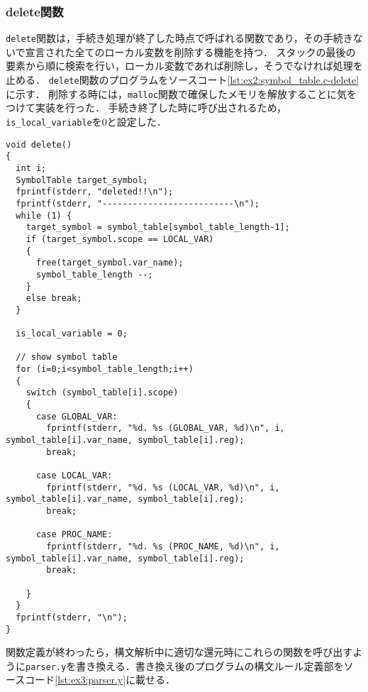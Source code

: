 \documentclass[uplatex]{jsarticle}
\begin{document}
\subsubsection{delete関数}
\verb#delete#関数は，手続き処理が終了した時点で呼ばれる関数であり，その手続きないで宣言された全てのローカル変数を削除する機能を持つ．
スタックの最後の要素から順に検索を行い，ローカル変数であれば削除し，そうでなければ処理を止める．
\verb#delete#関数のプログラムをソースコート\ref{lst:ex2:symbol_table.c-delete}に示す．
削除する時には，\verb#malloc#関数で確保したメモリを解放することに気をつけて実装を行った．
手続き終了した時に呼び出されるため，\verb#is_local_variable#を0と設定した．
\begin{lstlisting}[caption=delete関数,label=lst:ex2:symbol_table.c-delete]
void delete()
{
  int i;
  SymbolTable target_symbol;
  fprintf(stderr, "deleted!!\n");
  fprintf(stderr, "--------------------------\n");
  while (1) {
    target_symbol = symbol_table[symbol_table_length-1];
    if (target_symbol.scope == LOCAL_VAR)
    {
      free(target_symbol.var_name);
      symbol_table_length --;
    }
    else break;
  }

  is_local_variable = 0;

  // show symbol table
  for (i=0;i<symbol_table_length;i++)
  {
    switch (symbol_table[i].scope)
    {
      case GLOBAL_VAR:
        fprintf(stderr, "%d. %s (GLOBAL_VAR, %d)\n", i, symbol_table[i].var_name, symbol_table[i].reg);
        break;

      case LOCAL_VAR:
        fprintf(stderr, "%d. %s (LOCAL_VAR, %d)\n", i, symbol_table[i].var_name, symbol_table[i].reg);
        break;

      case PROC_NAME:
        fprintf(stderr, "%d. %s (PROC_NAME, %d)\n", i, symbol_table[i].var_name, symbol_table[i].reg);
        break;

    }
  }
  fprintf(stderr, "\n");
}
\end{lstlisting}
関数定義が終わったら，構文解析中に適切な還元時にこれらの関数を呼び出すように\verb#parser.y#を書き換える．書き換え後のプログラムの構文ルール定義部をソースコード\ref{lst:ex3:parser.y}に載せる．
\end{document}
